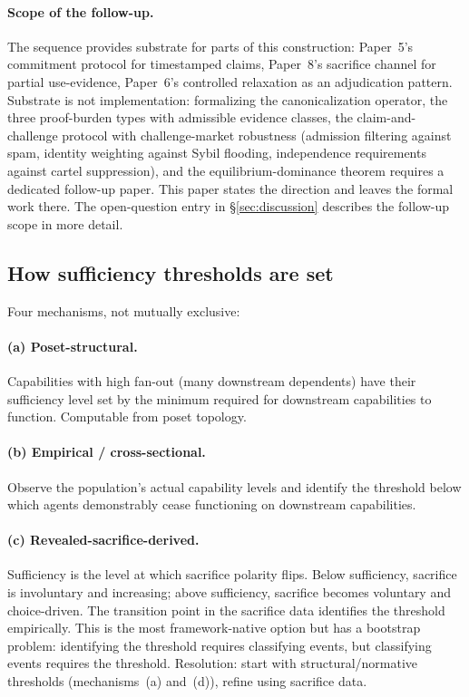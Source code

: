 \paragraph{Scope of the follow-up.}
The sequence provides substrate for parts of this construction:
Paper~5's commitment protocol for timestamped claims, Paper~8's
sacrifice channel for partial use-evidence, Paper~6's controlled
relaxation as an adjudication pattern.  Substrate is not
implementation: formalizing the canonicalization operator, the
three proof-burden types with admissible evidence classes, the
claim-and-challenge protocol with challenge-market robustness
(admission filtering against spam, identity weighting against
Sybil flooding, independence requirements against cartel
suppression), and the equilibrium-dominance theorem requires a
dedicated follow-up paper.  This paper states the direction and
leaves the formal work there.  The open-question entry in
\S\ref{sec:discussion} describes the follow-up scope in more
detail.

\subsection{How sufficiency thresholds are set}
\label{sec:threshold_setting}

Four mechanisms, not mutually exclusive:

\paragraph{(a) Poset-structural.}
Capabilities with high fan-out (many downstream dependents) have
their sufficiency level set by the minimum required for downstream
capabilities to function.  Computable from poset topology.

\paragraph{(b) Empirical / cross-sectional.}
Observe the population's actual capability levels and identify the
threshold below which agents demonstrably cease functioning on
downstream capabilities.

\paragraph{(c) Revealed-sacrifice-derived.}
Sufficiency is the level at which sacrifice polarity flips.
Below sufficiency, sacrifice is involuntary and increasing; above
sufficiency, sacrifice becomes voluntary and choice-driven.  The
transition point in the sacrifice data identifies the threshold
empirically.  This is the most framework-native option but has a
bootstrap problem: identifying the threshold requires classifying
events, but classifying events requires the threshold.
Resolution: start with structural/normative thresholds
(mechanisms~(a) and~(d)), refine using sacrifice data.


